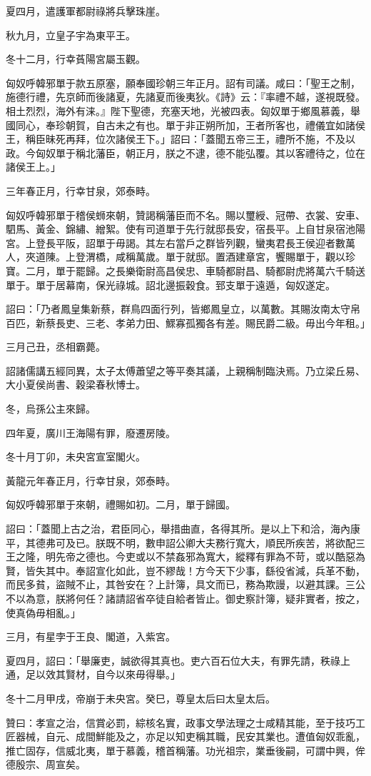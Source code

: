 \begin{pinyinscope}
夏四月，遣護軍都尉祿將兵擊珠崖。

秋九月，立皇子宇為東平王。

冬十二月，行幸萯陽宮屬玉觀。

匈奴呼韓邪單于款五原塞，願奉國珍朝三年正月。詔有司議。咸曰：「聖王之制，施德行禮，先京師而後諸夏，先諸夏而後夷狄。《詩》云：『率禮不越，遂視既發。相土烈烈，海外有涞。』陛下聖德，充塞天地，光被四表。匈奴單于鄉風慕義，舉國同心，奉珍朝賀，自古未之有也。單于非正朔所加，王者所客也，禮儀宜如諸侯王，稱臣昧死再拜，位次諸侯王下。」詔曰：「蓋聞五帝三王，禮所不施，不及以政。今匈奴單于稱北藩臣，朝正月，朕之不逮，德不能弘覆。其以客禮待之，位在諸侯王上。」

三年春正月，行幸甘泉，郊泰畤。

匈奴呼韓邪單于稽侯蛳來朝，贊謁稱藩臣而不名。賜以璽綬、冠帶、衣裳、安車、駟馬、黃金、錦繡、繒絮。使有司道單于先行就邸長安，宿長平。上自甘泉宿池陽宮。上登長平阪，詔單于毋謁。其左右當戶之群皆列觀，蠻夷君長王侯迎者數萬人，夾道陳。上登渭橋，咸稱萬歲。單于就邸。置酒建章宮，饗賜單于，觀以珍寶。二月，單于罷歸。之長樂衛尉高昌侯忠、車騎都尉昌、騎都尉虎將萬六千騎送單于。單于居幕南，保光祿城。詔北邊振穀食。郅支單于遠遁，匈奴遂定。

詔曰：「乃者鳳皇集新蔡，群鳥四面行列，皆鄉鳳皇立，以萬數。其賜汝南太守帛百匹，新蔡長吏、三老、孝弟力田、鰥寡孤獨各有差。賜民爵二級。毋出今年租。」

三月己丑，丞相霸薨。

詔諸儒講五經同異，太子太傅蕭望之等平奏其議，上親稱制臨決焉。乃立梁丘易、大小夏侯尚書、穀梁春秋博士。

冬，烏孫公主來歸。

四年夏，廣川王海陽有罪，廢遷房陵。

冬十月丁卯，未央宮宣室閣火。

黃龍元年春正月，行幸甘泉，郊泰畤。

匈奴呼韓邪單于來朝，禮賜如初。二月，單于歸國。

詔曰：「蓋聞上古之治，君臣同心，舉措曲直，各得其所。是以上下和洽，海內康平，其德弗可及已。朕既不明，數申詔公卿大夫務行寬大，順民所疾苦，將欲配三王之隆，明先帝之德也。今吏或以不禁姦邪為寬大，縱釋有罪為不苛，或以酷惡為賢，皆失其中。奉詔宣化如此，豈不繆哉！方今天下少事，繇役省減，兵革不動，而民多貧，盜賊不止，其咎安在？上計簿，具文而已，務為欺謾，以避其課。三公不以為意，朕將何任？諸請詔省卒徒自給者皆止。御史察計簿，疑非實者，按之，使真偽毋相亂。」

三月，有星孛于王良、閣道，入紫宮。

夏四月，詔曰：「舉廉吏，誠欲得其真也。吏六百石位大夫，有罪先請，秩祿上通，足以效其賢材，自今以來毋得舉。」

冬十二月甲戌，帝崩于未央宮。癸巳，尊皇太后曰太皇太后。

贊曰：孝宣之治，信賞必罰，綜核名實，政事文學法理之士咸精其能，至于技巧工匠器械，自元、成間鮮能及之，亦足以知吏稱其職，民安其業也。遭值匈奴乖亂，推亡固存，信威北夷，單于慕義，稽首稱藩。功光祖宗，業垂後嗣，可謂中興，侔德殷宗、周宣矣。


\end{pinyinscope}
